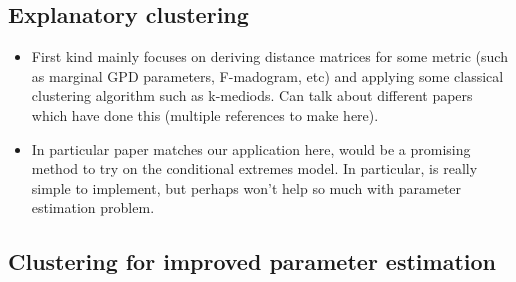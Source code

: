 \documentclass{article}
\numberwithin{equation}{section}
\begin{document}
\subsection{Explanatory clustering}

\begin{itemize}
  \item First kind mainly focuses on deriving distance matrices for some metric (such as marginal GPD parameters, F-madogram, etc) and applying some classical clustering algorithm such as k-mediods. Can talk about different papers which have done this (multiple references to make here).
  \item In particular \cite{Vignotto2021} paper matches our application here, would be a promising method to try on the conditional extremes model. In particular, is really simple to implement, but perhaps won't help so much with parameter estimation problem. 
\end{itemize}

\subsection{Clustering for improved parameter estimation}
\end{document}
